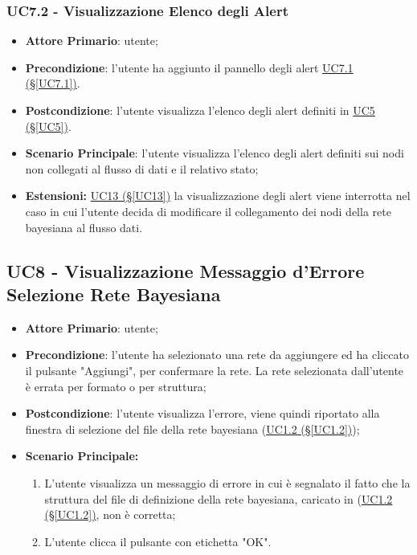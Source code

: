 \subsubsection{UC7.2 - Visualizzazione Elenco degli Alert}\label{UC7.2}
\begin{itemize}
	\item \textbf{Attore Primario}: utente;
	\item \textbf{Precondizione}:  l'utente ha aggiunto il pannello degli alert \hyperref[UC7.1]{UC7.1 (§\ref*{UC7.1})}.
	\item \textbf{Postcondizione}: l'utente visualizza l'elenco degli alert definiti in  \hyperref[UC5]{UC5 (§\ref*{UC5})}.
	\item \textbf{Scenario Principale}: l'utente visualizza l'elenco degli alert definiti sui nodi non collegati al flusso di dati e il relativo stato;
	\item \textbf{Estensioni:} \hyperref[UC13]{UC13 (§\ref*{UC13})} la visualizzazione degli alert viene interrotta nel caso in cui l'utente decida di modificare il collegamento dei nodi della rete bayesiana al flusso dati.
\end{itemize}


\pagebreak

\subsection{UC8 - Visualizzazione Messaggio d'Errore Selezione Rete Bayesiana}\label{UC8}
\begin{itemize}
\item \textbf{Attore Primario}: utente;
\item \textbf{Precondizione}: l'utente ha selezionato una rete da aggiungere ed ha cliccato il pulsante "Aggiungi", per confermare la rete. La rete selezionata dall'utente è errata per formato o per struttura;
\item \textbf{Postcondizione}: l'utente visualizza l'errore, viene quindi riportato alla finestra di selezione del file della rete bayesiana (\hyperref[UC1.2]{UC1.2 (§\ref*{UC1.2})});
\item \textbf{Scenario Principale:} 
	\begin{enumerate}
	\item L'utente visualizza un messaggio di errore in cui è segnalato il fatto che la struttura del file di definizione della rete bayesiana, caricato in (\hyperref[UC1.2]{UC1.2 (§\ref*{UC1.2})}, non è corretta;
	\item L'utente clicca il pulsante con etichetta "OK".
	\end{enumerate}
\end{itemize}

